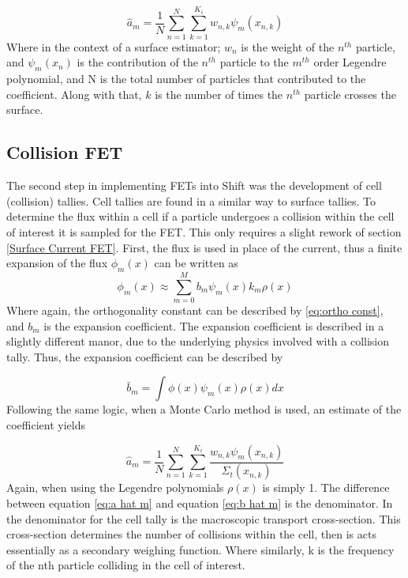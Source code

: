 \documentclass[10tma4paper]{article}
\begin{document}
	 \begin{equation} \label{eq:a hat m}
	 \hat{a}_{m}=\frac{1}{N}\sum_{n=1}^{N}\sum_{k=1}^{K_{i}}w_{n,k}\psi_{m}(x_{n,k})
	 \end{equation}
Where in the context of a surface estimator; $w_{n}$ is the weight of the $n^{th}$ particle, and $\psi_{m}(x_{n})$ is the contribution of the $n^{th}$ particle to the $m^{th}$ order Legendre polynomial, and N is the total number of particles that contributed to the coefficient. Along with that, $k$ is the number of times the $n^{th}$ particle crosses the surface.

\subsection{Collision FET}\label{Cell Tally}
The second step in implementing FETs into Shift was the development of cell (collision)  tallies. Cell tallies are found in a similar way to surface tallies. To determine the flux within a cell if a particle undergoes a collision within the cell of interest it is sampled for the FET. This only requires a slight rework of section \eqref{Surface Current FET}. First, the flux is used in place of the current, thus a finite expansion of the flux $\phi_{m}(x)$ can be written as
\begin{equation}
\phi_{m}(x) \approx \sum_{m=0}^{M}b_{m}\psi_{m}(x)k_{m}\rho(x)
\end{equation}
Where again, the orthogonality constant can be described by \eqref{eq:ortho const}, and $b_{m}$ is the expansion coefficient. The expansion coefficient is described in a slightly different manor, due to the underlying physics involved with a collision tally. Thus, the expansion coefficient can be described by

 \begin{equation} \label{eq:b bar m}
 \bar{b}_{m}=\int \phi(x)\psi_{m}(x)\rho(x)dx
 \end{equation}
Following the same logic, when a Monte Carlo method is used, an estimate of the coefficient yields

	 \begin{equation} \label{eq:b hat m}
	 \hat{a}_{m}=\frac{1}{N}\sum_{n=1}^{N}\sum_{k=1}^{K_{i}}\frac{w_{n,k}\psi_{m}(x_{n,k})}{\Sigma_{t}(x_{n,k})}
	 \end{equation}
Again, when using the Legendre polynomials 
$\rho(x)$ is simply 1. The difference between equation \ref{eq:a hat m} and equation \eqref{eq:b hat m} is the denominator. In the denominator for the cell tally is the macroscopic transport cross-section. This cross-section determines the number of collisions within the cell, then is acts essentially as a secondary weighing function. Where similarly, k is the frequency of the nth particle colliding in the cell of interest.
\end{document}
